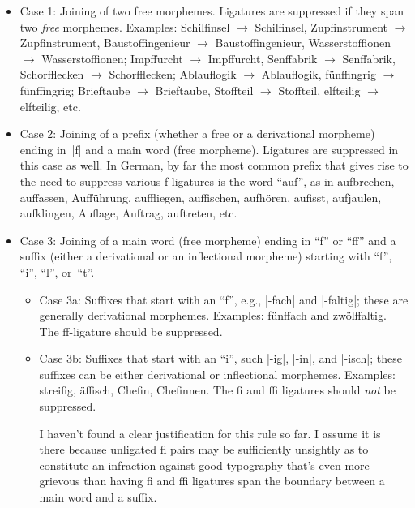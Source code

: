 \documentclass[11pt]{article}
\begin{document}
\begin{itemize}
\item Case 1: Joining of two free morphemes. Ligatures are suppressed if they span two \emph{free} morphemes. Examples: Schil\mbox{fi}nsel $\to$ Schilfinsel, Zup\mbox{fi}nstrument $\to$ Zupfinstrument, Bausto\mbox{ffi}ngenieur $\to$ Baustoffingenieur, Wassersto\mbox{ffi}onen $\to$ Wasserstoffionen; Imp\mbox{ff}urcht $\to$ Impffurcht, Sen\mbox{ff}abrik $\to$ Senffabrik, Schor\mbox{ffl}ecken $\to$ Schorfflecken; Ablau\mbox{fl}ogik $\to$ Ablauflogik,  fün\mbox{ffi}ngrig $\to$ fünffingrig; Brie\mbox{ft}aube $\to$ Brieftaube, Sto\mbox{fft}eil $\to$ Stoffteil, el\mbox{ft}eilig $\to$ elfteilig, etc.

\item Case 2: Joining of a prefix (whether a free or a derivational morpheme) ending in~|f| and a main word (free morpheme). Ligatures are suppressed in this case as well. In German, by far the most common prefix that gives rise to the need to suppress various f-ligatures is the word \enquote{auf}, as in aufbrechen, auffassen, Aufführung, auffliegen, auffischen, aufhören, aufisst, aufjaulen, aufklingen, Auflage, Auftrag, auftreten, etc.

\item Case 3: Joining of a main word (free morpheme) ending in \enquote{f} or \enquote{ff} and a suffix (either a derivational or an inflectional morpheme) starting with \enquote{f}, \enquote{i}, \enquote{l}, or~\enquote{t}.

\begin{itemize}
\item Case 3a: Suffixes that start with an \enquote{f}, e.g., |-fach| and |-faltig|; these are generally derivational morphemes. Examples: fünffach and zwölffaltig. The ff-ligature should be suppressed. 

\item Case 3b: Suffixes that start with an \enquote{i}, such |-ig|, |-in|, and |-isch|; these suffixes can be either derivational or inflectional morphemes. Examples: streifig, äffisch, Chefin, Chefinnen. The fi and ffi ligatures should \emph{not} be suppressed. 

I haven't found a clear justification for this rule so far. I assume it is there because unligated f\breaklig i pairs may be sufficiently unsightly as to constitute an infraction against good typography that's even more grievous than having fi and ffi ligatures span the boundary between a main word and a suffix.



\end{itemize}
\end{itemize}
\end{document}
